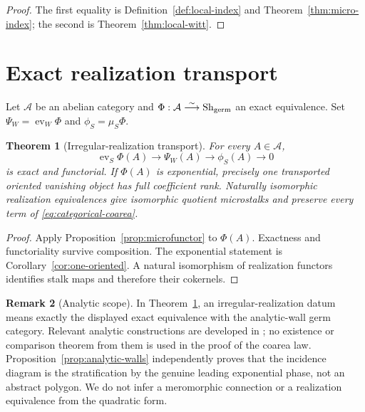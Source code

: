 \documentclass[11pt,a4paper]{amsart}
\theoremstyle{plain}
\newtheorem{theorem}{Theorem}[section]
\theoremstyle{definition}
\newtheorem{remark}[theorem]{Remark}
\newcommand{\Sh}{\operatorname{Sh}}
\begin{document}
\begin{proof}
The first equality is Definition~\ref{def:local-index} and Theorem~\ref{thm:micro-index}; the second
is Theorem~\ref{thm:local-witt}.
\end{proof}

\section{Exact realization transport}\label{sec:transport}

Let $\mathcal A$ be an abelian category and
$\Phi:\mathcal A\overset\sim\longrightarrow\Sh_{\rm germ}$ an exact equivalence.  Set
$\Psi_W=\operatorname{ev}_W\Phi$ and $\phi_S=\mu_S\Phi$.

\begin{theorem}[Irregular-realization transport]\label{thm:transport}
For every $A\in\mathcal A$,
\begin{equation}\label{eq:transport-exact}
 \operatorname{ev}_S\Phi(A)\longrightarrow\Psi_W(A)
 \longrightarrow\phi_S(A)\longrightarrow0
\end{equation}
is exact and functorial.  If $\Phi(A)$ is exponential, precisely one transported oriented
vanishing object has full coefficient rank.  Naturally isomorphic realization equivalences give
isomorphic quotient microstalks and preserve every term of \eqref{eq:categorical-coarea}.
\end{theorem}

\begin{proof}
Apply Proposition~\ref{prop:microfunctor} to $\Phi(A)$.  Exactness and functoriality survive
composition.  The exponential statement is Corollary~\ref{cor:one-oriented}.  A natural
isomorphism of realization functors identifies stalk maps and therefore their cokernels.
\end{proof}

\begin{remark}[Analytic scope]
In Theorem~\ref{thm:transport}, an irregular-realization datum means exactly the displayed exact
equivalence with the analytic-wall germ category.  Relevant analytic constructions are developed
in \cite{Sabbah,DKRH,DKVanishing}; no existence or comparison theorem from them is used in the
proof of the coarea law.  Proposition~\ref{prop:analytic-walls} independently proves that the
incidence diagram is the stratification by the genuine leading exponential phase, not an abstract
polygon.  We do not infer a meromorphic connection or a realization equivalence from the
quadratic form.
\end{remark}
\end{document}

